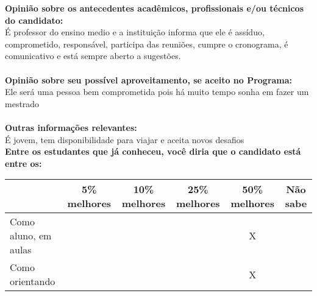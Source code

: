\documentclass[11pt]{article}
\begin{document}
\textbf{Opinião sobre os antecedentes acadêmicos, profissionais e/ou técnicos do candidato:}
\\É professor do ensino medio e a instituição informa que ele é assíduo, comprometido, responsável, participa das reuniões, cumpre o cronograma, é comunicativo e está sempre aberto a sugestões.\\
\\
\textbf{Opinião sobre seu possível aproveitamento, se aceito no Programa:}
\\Ele será uma pessoa bem comprometida pois há muito tempo sonha em fazer um mestrado\\ 
\\
\textbf{Outras informações relevantes:} \\É jovem, tem disponibilidade para viajar e aceita novos desafios
\\[0.3cm]
\textbf{Entre os estudantes que já conheceu, você diria que o candidato está entre os:}
\\
\begin{tabular}{|l|c|c|c|c|c|}
\hline
 & 5\% melhores & 10\% melhores & 25\% melhores & 50\% melhores & Não sabe \\
\hline
Como aluno, em aulas &  &  &  & X & \\
\hline
Como orientando &  &  &  & X & \\
\hline
\end{tabular}
\end{document}
